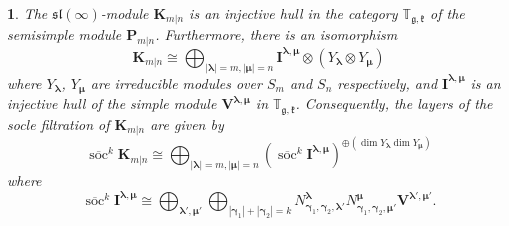 \documentclass[12pt,oneside,english]{amsart}
\numberwithin{equation}{section}
\numberwithin{figure}{section}
\theoremstyle{plain}
\newtheorem{thm}{\protect\theoremname}
\theoremstyle{plain}
\theoremstyle{remark}
\theoremstyle{definition}
\theoremstyle{plain}
\theoremstyle{remark}
\theoremstyle{definition}
\theoremstyle{plain}
\theoremstyle{plain}
\theoremstyle{definition}
\providecommand{\theoremname}{Theorem}
\newcommand{\bP}{\mathbf{P}}
\newcommand{\bV}{\mathbf{V}}
\newcommand{\bK}{\mathbf{K}}
\newcommand{\bI}{\mathbf{I}}
\newcommand{\soc}{\operatorname{soc}}
\newcommand{\fg}{\mathfrak{g}}
\newcommand{\fk}{\mathfrak{k}}
\begin{document}
\begin{thm}\label{thm: T injective} The $\mathfrak{sl}(\infty)$-module $\bK_{m|n}$ is an injective hull in the category $\mathbb T_{\fg,\fk}$ of the semisimple module $\bP_{m|n}$. Furthermore, there is an isomorphism
$$
\bK_{m|n}\cong\bigoplus_{|\boldsymbol{\lambda}|=m,|\boldsymbol{\mu}|=n}\bI^{\boldsymbol{\lambda},\boldsymbol{\mu}}\otimes(Y_{\boldsymbol{\lambda}}\otimes Y_{{\boldsymbol{\mu}}})
$$
where $Y_{\boldsymbol{\lambda}}$, $Y_{\boldsymbol{\mu}}$ are irreducible modules over $S_m$ and $S_n$ respectively, and $\bI^{\boldsymbol{\lambda},\boldsymbol{\mu}}$ is an injective hull of the simple module $\bV^{\boldsymbol{\lambda},\boldsymbol{\mu}}$ in $\mathbb T_{\fg,\fk}$. Consequently, the layers of the socle filtration of $\bK_{m|n}$  are given by
 $$
\overline{\soc}^k  \bK_{m|n}\cong\bigoplus_{|\boldsymbol{\lambda}|=m,|\boldsymbol{\mu}|=n}(\overline{\soc}^k \bI^{\boldsymbol{\lambda},\boldsymbol{\mu}})^{\oplus (\dim Y_{\boldsymbol{\lambda}} \dim Y_{{\boldsymbol{\mu}}})}
$$
where
$$\overline{\soc}^k \bI^{\boldsymbol{\lambda},{\boldsymbol{\mu}}}\cong
\bigoplus_{\boldsymbol{\lambda'},\boldsymbol{\mu'}}
\bigoplus_{|{\boldsymbol{\gamma}}_1|+|{\boldsymbol{\gamma}}_2|=k}
      N^{\boldsymbol{\lambda}}_{{\boldsymbol{\gamma}}_1,{\boldsymbol{\gamma}}_2,\boldsymbol{\lambda}'}N^{{\boldsymbol{\mu}}}_{{\boldsymbol{\gamma}}_1,{\boldsymbol{\gamma}}_2,{\boldsymbol{\mu}}'}\bV^{\boldsymbol{\lambda}',{\boldsymbol{\mu}}'}.$$
\end{thm}
\end{document}
